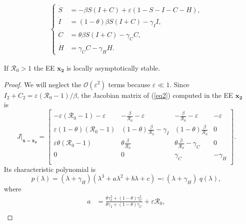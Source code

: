 \documentclass[10pt,a4paper]{amsart}
\begin{document}
\begin{align} \label{eq2}
\left\{
\begin{aligned}
    \dot{S} &= -\beta S (I+C) + \varepsilon (1-S-I-C-H), \\ 
    \dot{I} &= (1-\theta)\beta S (I+C) - \gamma_I I, \\ 
    \dot{C} &= \theta \beta S(I+C) - \gamma_C C, \\ 
    \dot{H} &= \gamma_C C - \gamma_H H.
\end{aligned}
\right.
\end{align}

\begin{theorem}
    If $\mathcal{R}_0>1$ the EE $\mathbf{x_2}$ is locally asymptotically stable. 
\end{theorem}

\begin{proof}
    We will neglect the $\mathcal{O}(\varepsilon^2)$ terms because $\varepsilon \ll 1$. Since $I_2+C_2 = \varepsilon (\mathcal{R}_0-1)/\beta$, the Jacobian matrix of (\ref{eq2}) computed in the EE $\mathbf{x_2}$ is 
    \begin{equation*}
        J|_{\mathbf{x}=\mathbf{x_2}} = 
        \begin{bmatrix}
            -\varepsilon(\mathcal{R}_0-1)-\varepsilon & -\frac{\beta}{\mathcal{R}_0}-\varepsilon & -\frac{\beta}{\mathcal{R}_0}-\varepsilon & -\varepsilon \\ 
            \varepsilon(1-\theta)(\mathcal{R}_0-1) & (1-\theta) \frac{\beta}{\mathcal{R}_0}-\gamma_I & (1-\theta) \frac{\beta}{\mathcal{R}_0} & 0 \\ 
            \varepsilon\theta(\mathcal{R}_0-1) & \theta \frac{\beta}{\mathcal{R}_0} & \theta \frac{\beta}{\mathcal{R}_0}-\gamma_C & 0 \\ 
            0 & 0 & \gamma_C & -\gamma_H \\ 
        \end{bmatrix}. 
    \end{equation*}
    Its characteristic polynomial is 
    \begin{equation*}
        p(\lambda)=(\lambda+\gamma_H) (\lambda^3+a\lambda^2+b\lambda+c) \eqqcolon (\lambda+\gamma_H) \; q(\lambda), 
    \end{equation*}
    where 
    \begin{equation*}
    \begin{split}
        a&=\frac{\theta \gamma_I^2 + (1-\theta)\gamma_C^2}{\theta \gamma_I + (1-\theta)\gamma_C} + \varepsilon \mathcal{R}_0, \\ 

\end{split}
\end{equation*}
\end{proof}
\end{document}
